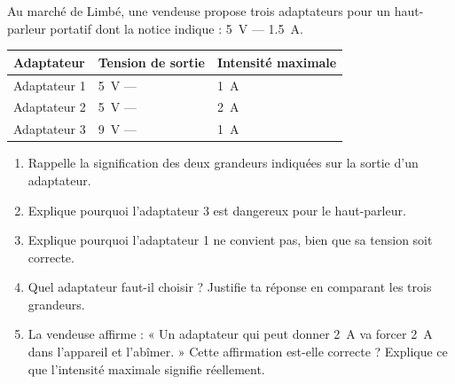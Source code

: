 \documentclass[11pt]{article}
\begin{document}
\begin{exercice}
Au marché de Limbé, une vendeuse propose trois adaptateurs pour un haut-parleur portatif dont la notice indique : \SI{5}{V} $\text{---}$ \SI{1,5}{A}.

\begin{center}
\begin{tabularx}{\linewidth}{|l|X|X|}
\hline
\rowcolor{popblueL} Adaptateur & Tension de sortie & Intensité maximale \\
\hline
Adaptateur 1 & \SI{5}{V} $\text{---}$ & \SI{1}{A} \\
\hline
Adaptateur 2 & \SI{5}{V} $\text{---}$ & \SI{2}{A} \\
\hline
Adaptateur 3 & \SI{9}{V} $\text{---}$ & \SI{1}{A} \\
\hline
\end{tabularx}
\end{center}

\begin{enumerate}
\item Rappelle la signification des deux grandeurs indiquées sur la sortie d'un adaptateur.
\item Explique pourquoi l'adaptateur 3 est dangereux pour le haut-parleur.
\item Explique pourquoi l'adaptateur 1 ne convient pas, bien que sa tension soit correcte.
\item Quel adaptateur faut-il choisir ? Justifie ta réponse en comparant les trois grandeurs.
\item La vendeuse affirme : « Un adaptateur qui peut donner \SI{2}{A} va forcer \SI{2}{A} dans l'appareil et l'abîmer. » Cette affirmation est-elle correcte ? Explique ce que l'intensité maximale signifie réellement.
\end{enumerate}
\end{exercice}
\end{document}
